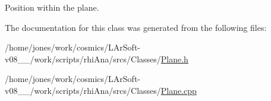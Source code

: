 Position within the plane. 



The documentation for this class was generated from the following files\-:\begin{DoxyCompactItemize}
\item 
/home/jones/work/cosmics/\-L\-Ar\-Soft-\/v08\-\_\-\_/work/scripts/rhi\-Ana/srcs/\-Classes/\hyperlink{Plane_8h}{Plane.\-h}\item 
/home/jones/work/cosmics/\-L\-Ar\-Soft-\/v08\-\_\-\_/work/scripts/rhi\-Ana/srcs/\-Classes/\hyperlink{Plane_8cpp}{Plane.\-cpp}\end{DoxyCompactItemize}
